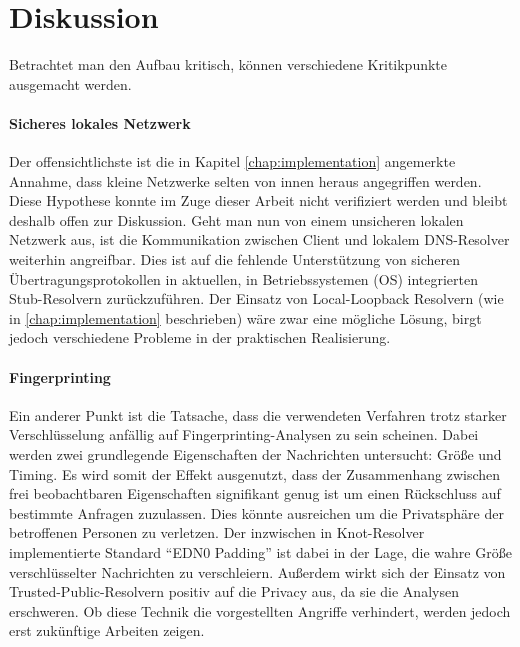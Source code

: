 \section{Diskussion}
Betrachtet man den Aufbau kritisch, können verschiedene Kritikpunkte ausgemacht werden. 

\paragraph{Sicheres lokales Netzwerk}
Der offensichtlichste ist die in Kapitel \ref{chap:implementation} angemerkte Annahme, dass kleine Netzwerke selten von innen heraus angegriffen werden. Diese Hypothese konnte im Zuge dieser Arbeit nicht verifiziert werden und bleibt deshalb offen zur Diskussion. Geht man nun von einem unsicheren lokalen Netzwerk aus, ist die Kommunikation zwischen Client und lokalem DNS-Resolver weiterhin angreifbar. Dies ist auf die fehlende Unterstützung von sicheren Übertragungsprotokollen in aktuellen, in Betriebssystemen (OS) integrierten Stub-Resolvern zurückzuführen. Der Einsatz von Local-Loopback Resolvern (wie in \ref{chap:implementation} beschrieben) wäre zwar eine mögliche Lösung, birgt jedoch verschiedene Probleme in der praktischen Realisierung.

\paragraph{Fingerprinting}
Ein anderer Punkt ist die Tatsache, dass die verwendeten Verfahren trotz starker Verschlüsselung anfällig auf Fingerprinting-Analysen zu sein scheinen\cite{Shulman2014}\cite{Siby2018}. Dabei werden zwei grundlegende Eigenschaften der Nachrichten untersucht: Größe und Timing. Es wird somit der Effekt ausgenutzt, dass der Zusammenhang zwischen frei beobachtbaren Eigenschaften signifikant genug ist um einen Rückschluss auf bestimmte Anfragen zuzulassen. Dies könnte ausreichen um die Privatsphäre der betroffenen Personen zu verletzen. Der inzwischen in Knot-Resolver implementierte Standard ``EDN0 Padding''\cite{rfc7830} ist dabei in der Lage, die wahre Größe verschlüsselter Nachrichten zu verschleiern. Außerdem wirkt sich der Einsatz von Trusted-Public-Resolvern positiv auf die Privacy aus, da sie die Analysen erschweren\cite{Shulman2014}. Ob diese Technik die vorgestellten Angriffe verhindert, werden jedoch erst zukünftige Arbeiten zeigen. 

